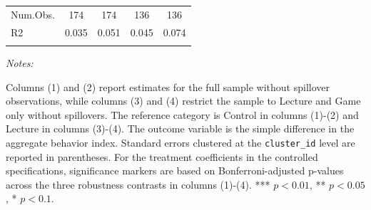 \begin{table}[htbp]
\begin{tabular}{lcccc}
Num.Obs. & \num{174} & \num{174} & \num{136} & \num{136} \\
R2 & \num{0.035} & \num{0.051} & \num{0.045} & \num{0.074} \\
\\
\hline
\hline
\end{tabular}
{\begin{flushleft}\parbox{\textwidth}{\tiny \hspace*{0.1cm}
\textit{Notes:}} Columns (1) and (2) report estimates for the full sample without spillover observations, while columns (3) and (4) restrict the sample to Lecture and Game only without spillovers. The reference category is Control in columns (1)-(2) and Lecture in columns (3)-(4). The outcome variable is the simple difference in the aggregate behavior index. Standard errors clustered at the \texttt{cluster\_id} level are reported in parentheses. For the treatment coefficients in the controlled specifications, significance markers are based on Bonferroni-adjusted p-values across the three robustness contrasts in columns (1)-(4). *** $p < 0.01$, ** $p < 0.05$, * $p < 0.1$.
\end{flushleft}}
\end{table}
